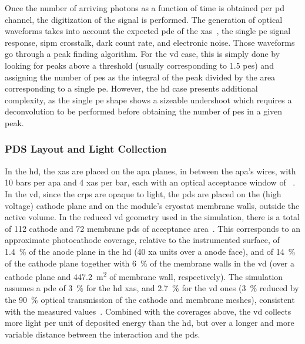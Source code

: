 Once the number of arriving photons as a function of time is obtained per \gls{pd} channel, the digitization of the signal is performed. The generation of optical waveforms takes into account the expected \gls{pde} of the \gls{xa}s~\cite{alvarez2024measurement,botogoske2026measurementxarapucasabsolutephoton}, the single \gls{pe} signal response, \gls{sipm} crosstalk, dark count rate, and electronic noise. Those waveforms go through a peak finding algorithm. For the \gls{vd} case, this is simply done by looking for peaks above a threshold (usually corresponding to 1.5 \gls{pe}s) and assigning the number of \gls{pe}s as the integral of the peak divided by the area corresponding to a single \gls{pe}. However, the \gls{hd} case presents additional complexity, as the single \gls{pe} shape shows a sizeable undershoot which requires a deconvolution to be performed before obtaining the number of \gls{pe}s in a given peak. 

\subsubsection{PDS Layout and Light Collection}
In the \gls{hd}, the \gls{xa}s are placed on the \gls{apa} planes, in between the \gls{apa}'s wires, with 10 bars per \gls{apa} and 4 \gls{xa}s per bar, each with an optical acceptance window of ~\cite{alvarez2024measurement}. In the \gls{vd}, since the \gls{crp}s are opaque to light, the \gls{pd}s are placed on the (high voltage) cathode plane and on the module's cryostat membrane walls, outside the active volume. In the reduced \gls{vd} geometry used in the simulation, there is a total of 112 cathode and 72 membrane \gls{pd}s of  acceptance area~\cite{botogoske2026measurementxarapucasabsolutephoton}. This corresponds to an approximate photocathode coverage, relative to the instrumented surface, of \SI{1.4}{\percent} of the anode plane in the \gls{hd} (40 \gls{xa} units over a  anode face), and of \SI{14}{\percent} of the cathode plane together with \SI{6}{\percent} of the membrane walls in the \gls{vd} (over a  cathode plane and \SI{447.2}{\meter\squared} of membrane wall, respectively). The simulation assumes a \gls{pde} of \SI{3}{\percent} for the \gls{hd} \gls{xa}s, and \SI{2.7}{\percent} for the \gls{vd} ones (\SI{3}{\percent} reduced by the \SI{90}{\percent} optical transmission of the cathode and membrane meshes), consistent with the measured values~\cite{alvarez2024measurement,botogoske2026measurementxarapucasabsolutephoton}. Combined with the coverages above, the \gls{vd} collects more light per unit of deposited energy than the \gls{hd}, but over a longer and more variable distance between the interaction and the \gls{pd}s.

